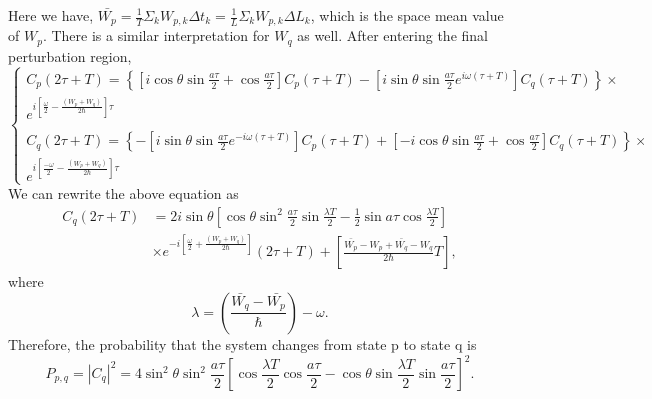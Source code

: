 Here we have,
$\bar{W_p}=\frac{1}{T}\Sigma_k W_{p,k}\Delta t_k=\frac{1}{L}\Sigma_k
W_{p,k} \Delta L_k$, which is the space mean value of $W_p$. There is
a similar interpretation for $W_q$ as well. After entering the final
perturbation region,
\begin{equation}
\left\lbrace
\begin{array}{c}
  C_p(2\tau+T)=\left\lbrace \left[i \cos \theta \sin \frac{a\tau}{2}+\cos \frac{a\tau}{2}\right]C_p(\tau+T) -
  \left[i \sin \theta \sin \frac{a\tau}{2} e^{i \omega (\tau+T)}\right]C_q(\tau+T)\right\rbrace \times
  \\
  e^{i\left[\frac{\omega}{2}-\frac{(W_p+W_q)}{2\hbar}\right]\tau}\\
  \,
  \\
  C_q(2\tau+T)=\left\lbrace -\left[i \sin \theta \sin \frac{a\tau}{2} e^{-i \omega (\tau+T)}\right]C_p(\tau+T)+\left[ -i \cos \theta \sin \frac{a\tau}{2}+ \cos \frac{a\tau}{2}\right] C_q(\tau+T)\right\rbrace \times \\
  e^{i \left[\frac{-\omega}{2}-\frac{(W_p+W_q)}{2\hbar}\right]\tau}
\end{array}
\right.
\end{equation}
We can rewrite the above equation as
\begin{align}
  C_q(2\tau+T)&= 2i\sin \theta \left[ \cos \theta \sin^2 \frac{a\tau}{2}\sin \frac{\lambda T}{2} -\frac{1}{2}\sin a\tau \cos \frac{\lambda T}{2} \right] \nonumber \\ &\times e^{-i \left[\frac{\omega}{2} + \frac{(W_p+W_q)}{2\hbar}\right]}(2\tau+T) +
                                                                                                                                                                        \left[ \frac{\bar{W_p}-W_p+\bar{W_q}-W_q}{2\hbar} 
                                                                                                                                                                        T\right] ,
\end{align} 
where
\begin{equation}
\lambda= \left( \frac{\bar{W_q}-\bar{W_p}}{\hbar} \right)- \omega .
\end{equation}
Therefore, the probability that the system changes from state p to
state q is
%
\begin{equation}
P_{p,q}=|C_q|^2 =4 \sin ^2 \theta \sin ^2 \frac{a\tau}{2} \left[
\cos \frac{\lambda T}{2} \cos \frac{a\tau}{2} -
\cos \theta \sin \frac{\lambda T}{2} \sin \frac{a\tau}{2} \right] ^2 .
\end{equation}
